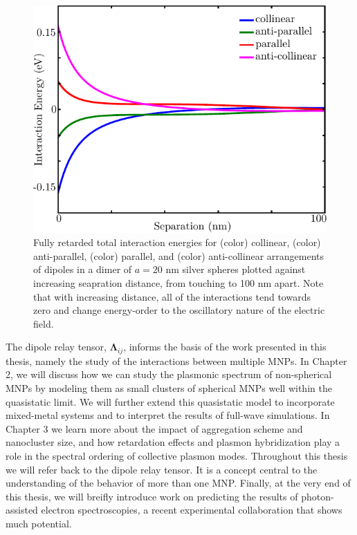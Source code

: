 \documentclass [11pt, proquest] {uwthesis}[2016/11/22]
\begin{document}
\begin{figure}
\begin{centering}
\includegraphics{dimer_ret_total.pdf}
\caption{Fully retarded total interaction energies for (color) collinear, (color) anti-parallel, (color) parallel, and (color) anti-collinear arrangements of dipoles in a dimer of $a=20$ nm silver spheres plotted against increasing seapration distance, from touching to 100 nm apart. Note that with increasing distance, all of the interactions tend towards zero and change energy-order to the oscillatory nature of the electric field.}
\label{dimer_ret_tot}
\end{centering}
\end{figure}

The dipole relay tensor, $\boldsymbol{\Lambda}_{ij}$, informs the basis of the work presented in this thesis, namely the study of the interactions between multiple MNPs. In Chapter 2, we will discuss how we can study the plasmonic spectrum of non-spherical MNPs by modeling them as small clusters of spherical MNPs well within the quasistatic limit. We will further extend this quasistatic model to incorporate mixed-metal systems and to interpret the results of full-wave simulations. In Chapter 3 we learn more about the impact of aggregation scheme and nanocluster size, and how retardation effects and plasmon hybridization play a role in the spectral ordering of collective plasmon modes. Throughout this thesis we will refer back to the dipole relay tensor. It is a concept central to the understanding of the behavior of more than one MNP. Finally, at the very end of this thesis, we will breifly introduce work on predicting the results of photon-assisted electron spectroscopies, a recent experimental collaboration that shows much potential.
\newpage
\end{document}
